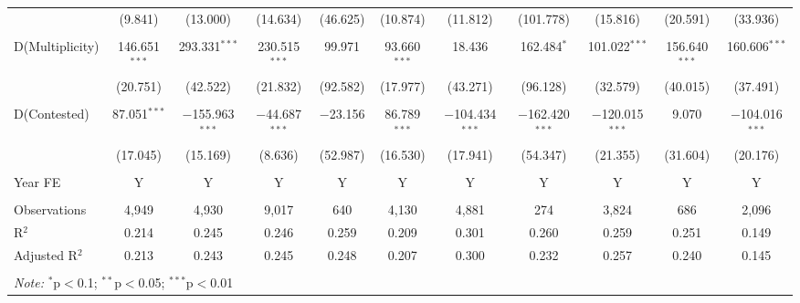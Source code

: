 \begin{landscape}
\begin{table}
{\begin{tabular}{lcccccccccc}
 & (9.841) & (13.000) & (14.634) & (46.625) & (10.874) & (11.812) & (101.778) & (15.816) & (20.591) & (33.936) \\ 
 & & & & & & & & & & \\ 
 D(Multiplicity) & 146.651$^{***}$ & 293.331$^{***}$ & 230.515$^{***}$ & 99.971 & 93.660$^{***}$ & 18.436 & 162.484$^{*}$ & 101.022$^{***}$ & 156.640$^{***}$ & 160.606$^{***}$ \\ 
 & (20.751) & (42.522) & (21.832) & (92.582) & (17.977) & (43.271) & (96.128) & (32.579) & (40.015) & (37.491) \\ 
 & & & & & & & & & & \\ 
 D(Contested) & 87.051$^{***}$ & $-$155.963$^{***}$ & $-$44.687$^{***}$ & $-$23.156 & 86.789$^{***}$ & $-$104.434$^{***}$ & $-$162.420$^{***}$ & $-$120.015$^{***}$ & 9.070 & $-$104.016$^{***}$ \\ 
 & (17.045) & (15.169) & (8.636) & (52.987) & (16.530) & (17.941) & (54.347) & (21.355) & (31.604) & (20.176) \\
 \hline \\[-1.8ex]
 Year FE & Y & Y & Y & Y & Y & Y & Y & Y & Y & Y \\
 \hline \\[-1.8ex] 
 Observations & 4,949 & 4,930 & 9,017 & 640 & 4,130 & 4,881 & 274 & 3,824 & 686 & 2,096 \\ 
 R$^{2}$ & 0.214 & 0.245 & 0.246 & 0.259 & 0.209 & 0.301 & 0.260 & 0.259 & 0.251 & 0.149 \\ 
 Adjusted R$^{2}$ & 0.213 & 0.243 & 0.245 & 0.248 & 0.207 & 0.300 & 0.232 & 0.257 & 0.240 & 0.145 \\ 
 \hline \\[-1.8ex] 
 \multicolumn{11}{l}{\textit{Note:} $^{*}$p$<$0.1; $^{**}$p$<$0.05; $^{***}$p$<$0.01} \\ 
 \end{tabular}}
 \end{table}
 \end{landscape}

